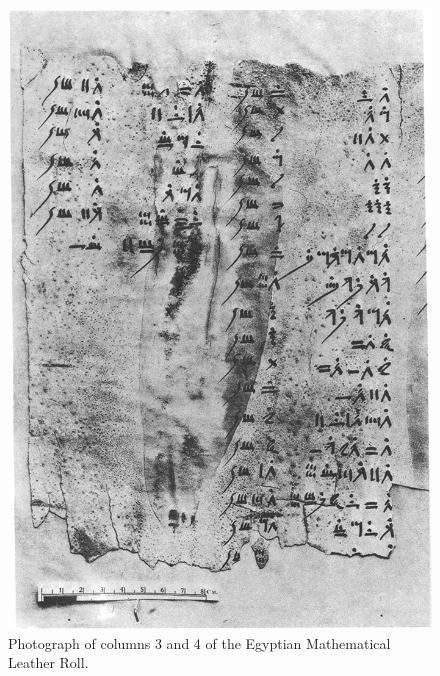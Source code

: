 \begin{figure}
  \centering
  \includegraphics[width=\textwidth]{gfx/EMLR}
  \caption[Photograph of columns 3 and 4 of the Egyptian Mathematical Leather Roll.]
  {Photograph of columns 3 and 4 of the Egyptian Mathematical Leather Roll.}
  \label{fig:EMLR}
\end{figure}

